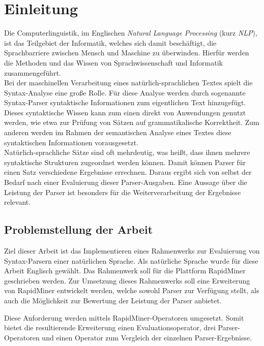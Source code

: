 %
\chapter{Einleitung}
\label{sec:intro}

Die Computerlinguistik, im Englischen \textit{Natural Language Processing} (kurz \textit{NLP}), ist das Teilgebiet der Informatik, welches sich damit beschäftigt, die Sprachbarriere zwischen Mensch und Maschine zu überwinden. Hierfür werden die Methoden und das Wissen von Sprachwissenschaft und Informatik zusammengeführt. \\
Bei der maschinellen Verarbeitung eines natürlich-sprachlichen Textes spielt die Syntax-Analyse eine große Rolle. Für diese Analyse werden durch sogenannte Syntax-Parser syntaktische Informationen zum eigentlichen Text hinzugefügt. Dieses syntaktische Wissen kann zum einen direkt von Anwendungen genutzt werden, wie etwa zur Prüfung von Sätzen auf grammatikalische Korrektheit. Zum anderen werden im Rahmen der semantischen Analyse eines Textes diese syntaktischen Informationen vorausgesetzt.\\
Natürlich-sprachliche Sätze sind oft mehrdeutig, was heißt, dass ihnen mehrere syntaktische Strukturen zugeordnet werden können. Damit können Parser für einen Satz verschiedene Ergebnisse errechnen. Daraus ergibt sich von selbst der Bedarf nach einer Evaluierung dieser Parser-Ausgaben. Eine Aussage über die Leistung der Parser ist besonders für die Weiterverarbeitung der Ergebnisse relevant. \cite{cl}

\section{Problemstellung der Arbeit}

Ziel dieser Arbeit ist das Implementieren eines Rahmenwerks zur Evaluierung von Syntax-Parsern einer natürlichen Sprache. Als natürliche Sprache wurde für diese Arbeit Englisch gewählt. Das Rahmenwerk soll für die Plattform RapidMiner \cite{rmstudio} geschrieben werden. Zur Umsetzung dieses Rahmenwerks soll eine Erweiterung von RapidMiner entwickelt werden, welche sowohl Parser zur Verfügung stellt, als auch die Möglichkeit zur Bewertung der Leistung der Parser anbietet. 

Diese Anforderung werden mittels RapidMiner-Operatoren umgesetzt. Somit bietet die resultierende Erweiterung einen Evaluationsoperator, drei Parser-Operatoren und einen Operator zum Vergleich der einzelnen Parser-Ergebnisse.

